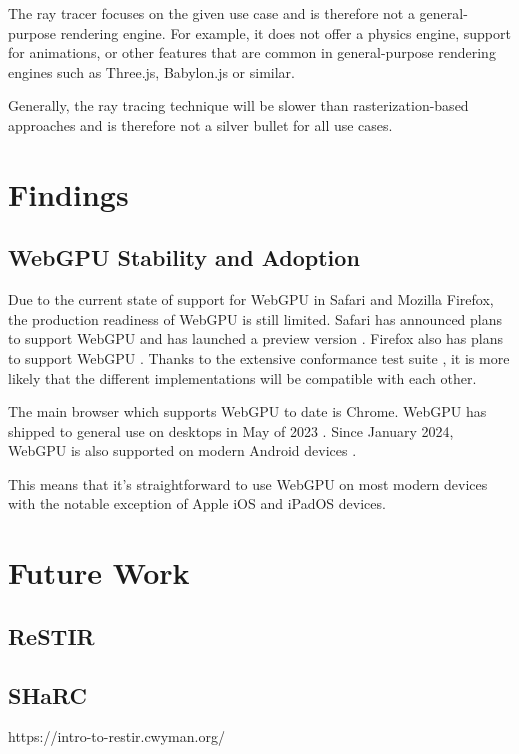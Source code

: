 
The ray tracer focuses on the given use case and is therefore not a general-purpose rendering engine. For example, it does not offer a physics engine, support for animations, or other features that are common in general-purpose rendering engines such as Three.js, Babylon.js or similar.

Generally, the ray tracing technique will be slower than rasterization-based approaches and is therefore not a silver bullet for all use cases.

\section{Findings}
\subsection{WebGPU Stability and Adoption}

Due to the current state of support for WebGPU in Safari and Mozilla Firefox, the production readiness of WebGPU is still limited. Safari has announced plans to support WebGPU and has launched a preview version \cite{SafariWebGPUSupport}. Firefox also has plans to support WebGPU \cite{FirefoxWebGPUSupport}. Thanks to the extensive conformance test suite \cite{WebGPUConformanceTestSuite}, it is more likely that the different implementations will be compatible with each other.

The main browser which supports WebGPU to date is Chrome. WebGPU has shipped to general use on desktops in May of 2023 \cite{ChromeWebGPUSupport}. Since January 2024, WebGPU is also supported on modern Android devices \cite{ChromeAndroidWebGPUSupport}.

This means that it's straightforward to use WebGPU on most modern devices with the notable exception of Apple iOS and iPadOS devices.

\section{Future Work}
\subsection{ReSTIR}
\subsection{SHaRC}

https://intro-to-restir.cwyman.org/